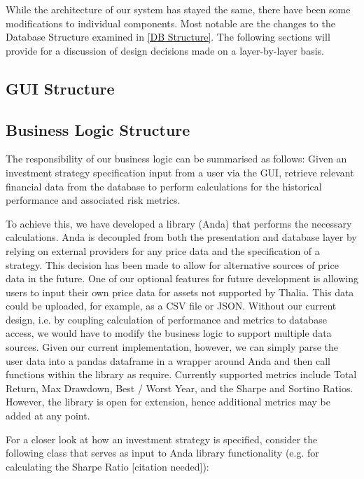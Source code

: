 \documentclass[main.tex]{subfiles}
\begin{document}
While the architecture of our system has stayed the same, there have been some modifications to individual components. Most notable are the changes to the Database Structure examined in \ref{DB Structure}. The following sections will provide for a discussion of design decisions made on a layer-by-layer basis.

\subsection{GUI Structure}


\subsection{Business Logic Structure}
\label{BL Structure}

The responsibility of our business logic can be summarised as follows: Given an investment strategy specification input from a user via the GUI, retrieve relevant financial data from the database to perform calculations for the historical performance and associated risk metrics.

To achieve this, we have developed a library (Anda) that performs the necessary calculations. Anda is decoupled from both the presentation and database layer by relying on external providers for any price data and the specification of a strategy.
This decision has been made to allow for alternative sources of price data in the future. One of our optional features for future development is allowing users to input their own price data for assets not supported by Thalia. This data could be uploaded, for example, as a CSV file or JSON. Without our current design, i.e. by coupling calculation of performance and metrics to database access, we would have to modify the business logic to support multiple data sources. Given our current implementation, however, we can simply parse the user data into a pandas dataframe in a wrapper around Anda and then call functions within the library as require.
Currently supported metrics include Total Return, Max Drawdown, Best / Worst Year, and the Sharpe and Sortino Ratios. However, the library is open for extension, hence additional metrics may be added at any point.

For a closer look at how an investment strategy is specified, consider the following class that serves as input to Anda library functionality (e.g. for calculating the Sharpe Ratio [citation needed]):
\end{document}
